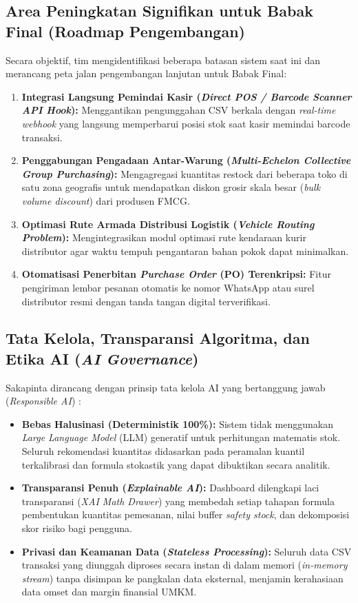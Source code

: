 \documentclass[12pt,a4paper]{article}
\begin{document}
\subsection{Area Peningkatan Signifikan untuk Babak Final (Roadmap Pengembangan)}
Secara objektif, tim mengidentifikasi beberapa batasan sistem saat ini dan merancang peta jalan pengembangan lanjutan untuk Babak Final:
\begin{enumerate}
    \item \textbf{Integrasi Langsung Pemindai Kasir (\textit{Direct POS / Barcode Scanner API Hook}):} Menggantikan pengunggahan CSV berkala dengan \textit{real-time webhook} yang langsung memperbarui posisi stok saat kasir memindai barcode transaksi.
    \item \textbf{Penggabungan Pengadaan Antar-Warung (\textit{Multi-Echelon Collective Group Purchasing}):} Mengagregasi kuantitas restock dari beberapa toko di satu zona geografis untuk mendapatkan diskon grosir skala besar (\textit{bulk volume discount}) dari produsen FMCG.
    \item \textbf{Optimasi Rute Armada Distribusi Logistik (\textit{Vehicle Routing Problem}):} Mengintegrasikan modul optimasi rute kendaraan kurir distributor agar waktu tempuh pengantaran bahan pokok dapat minimalkan.
    \item \textbf{Otomatisasi Penerbitan \textit{Purchase Order} (PO) Terenkripsi:} Fitur pengiriman lembar pesanan otomatis ke nomor WhatsApp atau surel distributor resmi dengan tanda tangan digital terverifikasi.
\end{enumerate}

\subsection{Tata Kelola, Transparansi Algoritma, dan Etika AI (\textit{AI Governance})}
Sakapinta dirancang dengan prinsip tata kelola AI yang bertanggung jawab (\textit{Responsible AI}) \citep{ribeiro2016trust}:
\begin{itemize}
    \item \textbf{Bebas Halusinasi (Deterministik 100\%):} Sistem tidak menggunakan \textit{Large Language Model} (LLM) generatif untuk perhitungan matematis stok. Seluruh rekomendasi kuantitas didasarkan pada peramalan kuantil terkalibrasi dan formula stokastik yang dapat dibuktikan secara analitik.
    \item \textbf{Transparansi Penuh (\textit{Explainable AI}):} Dashboard dilengkapi laci transparansi (\textit{XAI Math Drawer}) yang membedah setiap tahapan formula pembentukan kuantitas pemesanan, nilai buffer \textit{safety stock}, dan dekomposisi skor risiko bagi pengguna.
    \item \textbf{Privasi dan Keamanan Data (\textit{Stateless Processing}):} Seluruh data CSV transaksi yang diunggah diproses secara instan di dalam memori (\textit{in-memory stream}) tanpa disimpan ke pangkalan data eksternal, menjamin kerahasiaan data omset dan margin finansial UMKM.
\end{itemize}
\end{document}
